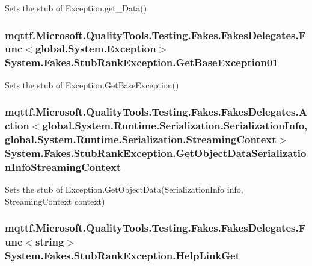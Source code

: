Sets the stub of Exception.\-get\-\_\-\-Data()

\hypertarget{class_system_1_1_fakes_1_1_stub_rank_exception_a23f8c4f88679a6850d4868d7f4b11a4f}{
\subsubsection[{Get\-Base\-Exception01}]{\setlength{\rightskip}{0pt plus 5cm}mqttf.\-Microsoft.\-Quality\-Tools.\-Testing.\-Fakes.\-Fakes\-Delegates.\-Func$<$global.\-System.\-Exception$>$ System.\-Fakes.\-Stub\-Rank\-Exception.\-Get\-Base\-Exception01}}\label{class_system_1_1_fakes_1_1_stub_rank_exception_a23f8c4f88679a6850d4868d7f4b11a4f}


Sets the stub of Exception.\-Get\-Base\-Exception()

\hypertarget{class_system_1_1_fakes_1_1_stub_rank_exception_a5a310bf6e9b974eb783e85a050da61a2}{
\subsubsection[{Get\-Object\-Data\-Serialization\-Info\-Streaming\-Context}]{\setlength{\rightskip}{0pt plus 5cm}mqttf.\-Microsoft.\-Quality\-Tools.\-Testing.\-Fakes.\-Fakes\-Delegates.\-Action$<$global.\-System.\-Runtime.\-Serialization.\-Serialization\-Info, global.\-System.\-Runtime.\-Serialization.\-Streaming\-Context$>$ System.\-Fakes.\-Stub\-Rank\-Exception.\-Get\-Object\-Data\-Serialization\-Info\-Streaming\-Context}}\label{class_system_1_1_fakes_1_1_stub_rank_exception_a5a310bf6e9b974eb783e85a050da61a2}


Sets the stub of Exception.\-Get\-Object\-Data(\-Serialization\-Info info, Streaming\-Context context)

\hypertarget{class_system_1_1_fakes_1_1_stub_rank_exception_a56f33b7bacc77261b446d0d685f7ae07}{
\subsubsection[{Help\-Link\-Get}]{\setlength{\rightskip}{0pt plus 5cm}mqttf.\-Microsoft.\-Quality\-Tools.\-Testing.\-Fakes.\-Fakes\-Delegates.\-Func$<$string$>$ System.\-Fakes.\-Stub\-Rank\-Exception.\-Help\-Link\-Get}}\label{class_system_1_1_fakes_1_1_stub_rank_exception_a56f33b7bacc77261b446d0d685f7ae07}


